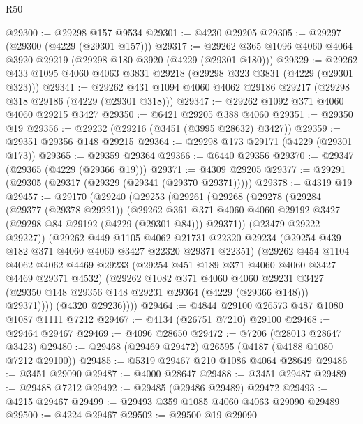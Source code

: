 \begin{lexlean}{R50}
\begin{coremodule}
@29300 := @29298 @157 @9534
@29301 := @4230 @29205
@29305 := @29297 (@29300 (@4229 (@29301 @157)))
@29317 := @29262 @365 @1096 @4060 @4064 @3920 @29219 (@29298 @180 @3920 (@4229 (@29301 @180)))
@29329 := @29262 @433 @1095 @4060 @4063 @3831 @29218 (@29298 @323 @3831 (@4229 (@29301 @323)))
@29341 := @29262 @431 @1094 @4060 @4062 @29186 @29217 (@29298 @318 @29186 (@4229 (@29301 @318)))
@29347 := @29262 @1092 @371 @4060 @4060 @29215 @3427
@29350 := @6421 @29205 @388 @4060
@29351 := @29350 @19
@29356 := @29232 (@29216 (@3451 (@3995 @28632) @3427))
@29359 := @29351 @29356 @148 @29215
@29364 := @29298 @173 @29171 (@4229 (@29301 @173))
@29365 := @29359 @29364
@29366 := @6440 @29356
@29370 := @29347 (@29365 (@4229 (@29366 @19)))
@29371 := @4309 @29205
@29377 := @29291 (@29305 (@29317 (@29329 (@29341 (@29370 @29371)))))
@29378 := @4319 @19
@29457 := @29170
    (@29240
      (@29253
        (@29261
          (@29268
            (@29278
              (@29284
                (@29377 (@29378 @29221))
                (@29262
                  @361
                  @371
                  @4060
                  @4060
                  @29192
                  @3427
                  (@29298 @84 @29192 (@4229 (@29301 @84)))
                  @29371))
              (@23479 @29222 @29227))
            (@29262
              @449
              @1105
              @4062
              @21731
              @22320
              @29234
              (@29254 @439 @182 @371 @4060 @4060 @3427 @22320 @29371 @22351)
              (@29262
                @454
                @1104
                @4062
                @4062
                @4469
                @29233
                (@29254 @451 @189 @371 @4060 @4060 @3427 @4469 @29371 @4532)
                (@29262
                  @1082
                  @371
                  @4060
                  @4060
                  @29231
                  @3427
                  (@29350 @148 @29356 @148 @29231 @29364 (@4229 (@29366 @148)))
                  @29371))))
          (@4320 @29236))))
@29464 := @4844 @29100 @26573 @487 @1080 @1087 @1111 @7212
@29467 := @4134 (@26751 @7210) @29100
@29468 := @29464 @29467
@29469 := @4096 @28650
@29472 := @7206 (@28013 @28647 @3423)
@29480 := @29468 (@29469 @29472) @26595 (@4187 (@4188 @1080 @7212 @29100))
@29485 := @5319 @29467 @210 @1086 @4064 @28649
@29486 := @3451 @29090
@29487 := @4000 @28647
@29488 := @3451 @29487
@29489 := @29488 @7212
@29492 := @29485 (@29486 @29489) @29472
@29493 := @4215 @29467
@29499 := @29493 @359 @1085 @4060 @4063 @29090 @29489
@29500 := @4224 @29467
@29502 := @29500 @19 @29090

\end{coremodule}
\end{lexlean}
